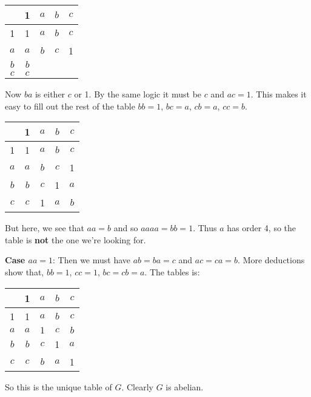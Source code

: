 \documentclass{article}
\begin{document}
\begin{enumerate}
    \begin{center}
        \begin{tabular}{ c | c c c c }
         & 1 & $a$ & $b$ & $c$ \\ 
        \hline
         1  &  1  & $a$ & $b$ & $c$ \\  
        $a$ & $a$ & $b$ & $c$ & 1 \\  
        $b$ & $b$ &  &  &  \\ 
        $c$ & $c$ &  &  &  \\ 
        \end{tabular}
    \end{center}

    Now $ba$ is either $c$ or 1. By the same logic it must be $c$ and $ac = 1$. This makes it easy to fill out the rest of the table $bb = 1$, $bc = a$, $cb = a$, $cc = b$.

    \begin{center}
        \begin{tabular}{ c | c c c c }
         & 1 & $a$ & $b$ & $c$ \\ 
        \hline
         1  &  1  & $a$ & $b$ & $c$ \\  
        $a$ & $a$ & $b$ & $c$ &  1  \\  
        $b$ & $b$ & $c$ &  1  & $a$ \\ 
        $c$ & $c$ &  1  & $a$ & $b$ \\ 
        \end{tabular}
    \end{center}

    But here, we see that $aa = b$ and so $aaaa = bb = 1$. Thus $a$ has order 4, so the table is \textbf{not} the one we're looking for. 

    \textbf{Case $aa = 1$}: Then we must have $ab = ba = c$ and $ac = ca = b$. More deductions show that, $bb = 1$, $cc = 1$, $bc = cb = a$. The tables is:

    \begin{center}
        \begin{tabular}{ c | c c c c }
         & 1 & $a$ & $b$ & $c$ \\ 
        \hline
         1  &  1  & $a$ & $b$ & $c$ \\  
        $a$ & $a$ & $1$ & $c$ & $b$ \\  
        $b$ & $b$ & $c$ & 1 & $a$ \\ 
        $c$ & $c$ & $b$ & $a$ & 1 \\ 
        \end{tabular}
    \end{center}

    So this is the unique table of $G$. Clearly $G$ is abelian.
    
\end{enumerate}
\end{document}
